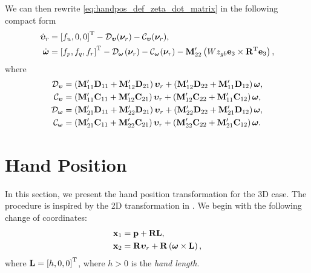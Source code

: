 \noindent We can then rewrite \eqref{eq:handpos_def_zeta_dot_matrix} in the following compact form
\begin{subequations}
    \begin{align}
        \dot{\bm{\upsilon}}_r &= \left[f_u, 0, 0\right]^{\mathrm{T}} - \mathcal{D}_{\bm{\upsilon}}(\bm{\nu}_r) - \mathcal{C}_{\bm{\upsilon}}(\bm{\nu}_r), \\
        \dot{\bm{\omega}} &= \left[f_p, f_q, f_r\right]^{\rm T} - \mathcal{D}_{\bm{\omega}}\hspace*{0.08em}(\bm{\nu}_r) - \mathcal{C}_{\bm{\omega}}(\bm{\nu}_r) - \mathbf{M}_{22}^{\prime}\left(Wz_{gb} \mathbf{e}_3 \times \mathbf{R}^{\mathrm{T}} \mathbf{e}_3\right),
    \end{align}
    \label{eq:handpos_def_ode_velocities}
\end{subequations}
where
\begin{subequations}
    \begin{align}
        \mathcal{D}_{\bm{\upsilon}} &= \left(\mathbf{M}_{11}^{\prime}\mathbf{D}_{11} + \mathbf{M}_{12}^{\prime}\mathbf{D}_{21}\right)\bm{\upsilon}_r + \left(\mathbf{M}_{12}^{\prime}\mathbf{D}_{22} + \mathbf{M}_{11}^{\prime}\mathbf{D}_{12}\right)\bm{\omega}, \\
        \mathcal{C}_{\bm{\upsilon}} &= \left(\mathbf{M}_{11}^{\prime}\mathbf{C}_{11} + \mathbf{M}_{12}^{\prime}\mathbf{C}_{21}\right)\bm{\upsilon}_r + \left(\mathbf{M}_{12}^{\prime}\mathbf{C}_{22} + \mathbf{M}_{11}^{\prime}\mathbf{C}_{12}\right)\bm{\omega}, \\
        \mathcal{D}_{\bm{\omega}} &= \left(\mathbf{M}_{21}^{\prime}\mathbf{D}_{11} + \mathbf{M}_{22}^{\prime}\mathbf{D}_{21}\right)\bm{\upsilon}_r + \left(\mathbf{M}_{22}^{\prime}\mathbf{D}_{22} + \mathbf{M}_{21}^{\prime}\mathbf{D}_{12}\right)\bm{\omega}, \\
        \mathcal{C}_{\bm{\omega}} &= \left(\mathbf{M}_{21}^{\prime}\mathbf{C}_{11} + \mathbf{M}_{22}^{\prime}\mathbf{C}_{21}\right)\bm{\upsilon}_r + \left(\mathbf{M}_{22}^{\prime}\mathbf{C}_{22} + \mathbf{M}_{21}^{\prime}\mathbf{C}_{12}\right)\bm{\omega}.
    \end{align} \label{eq:handpos_def_ode_components}
\end{subequations}

\section{Hand Position}
\label{sec:handpos_def_hand_position}
In this section, we present the hand position transformation for the 3D case.
The procedure is inspired by the 2D transformation in \cite{paliotta_trajectory_2019}.
We begin with the following change of coordinates:
\begin{subequations}
    \begin{align}
        \mathbf{x}_1 &= \mathbf{p} + \mathbf{R}\mathbf{L}, \label{eq:handpos_def_hand_position} \\
        \mathbf{x}_2 &= \mathbf{R}\bm{\upsilon}_r + \mathbf{R}\left(\bm{\omega} \times \mathbf{L}\right),
    \end{align} \label{eq:handpos_def_hand_transform_initial}
\end{subequations}
where $\mathbf{L} = \left[h, 0, 0\right]^{\mathrm{T}}$, where $h > 0$ is the \emph{hand length}.

